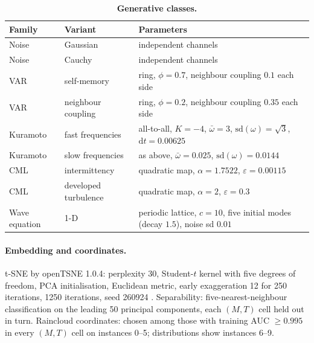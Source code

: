 \begin{table}[ht]
	\centering
	\caption{\textbf{Generative classes.} }
	\label{tab:classes}
	\small
	\begin{tabularx}{\linewidth}{@{} l l >{\raggedright\arraybackslash}X @{}}
		\toprule
		\rowcolor{tableheader}
		\textbf{Family} & \textbf{Variant} & \textbf{Parameters} \\
		\midrule
		Noise & Gaussian & independent channels \\
		Noise & Cauchy & independent channels \\
		VAR & self-memory & ring, $\phi = 0.7$, neighbour coupling $0.1$ each side \\
		VAR & neighbour coupling & ring, $\phi = 0.2$, neighbour coupling $0.35$ each side \\
		Kuramoto & fast frequencies & all-to-all, $K=-4$, $\bar{\omega} = 3$, $\mathrm{sd}(\omega) = \sqrt{3}$, $\mathrm{d}t = 0.00625$ \\
		Kuramoto & slow frequencies & as above, $\bar{\omega} = 0.025$, $\mathrm{sd}(\omega) = 0.0144$ \\
		CML & intermittency & quadratic map, $\alpha = 1.7522$, $\varepsilon = 0.00115$ \\
		CML & developed turbulence & quadratic map, $\alpha = 2$, $\varepsilon = 0.3$ \\
		Wave equation & 1-D & periodic lattice, $c = 10$, five initial modes (decay $1.5$), noise sd $0.01$ \\
		\bottomrule
	\end{tabularx}
\end{table}

\paragraph{Embedding and coordinates.} t-SNE by openTSNE 1.0.4: perplexity 30, Student-$t$ kernel with five degrees of freedom, PCA initialisation, Euclidean metric, early exaggeration 12 for 250 iterations, 1250 iterations, seed 260924 . Separability: five-nearest-neighbour classification on the leading 50 principal components, each $(M,T)$ cell held out in turn. Raincloud coordinates: chosen among those with training AUC $\geq 0.995$ in every $(M,T)$ cell on instances 0--5; distributions show instances 6--9.

